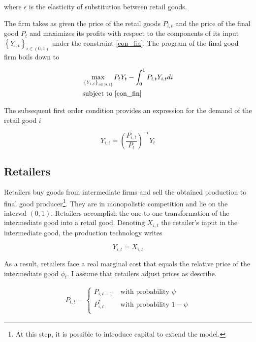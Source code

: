 where $\epsilon$ is the elasticity of substitution between retail goods.

The firm takes as given the price of the retail goods $P_{i,t}$ and the price of the final good $P_t$ and maximizes its profits with respect to the components of its input $\left\{Y_{i,t}\right\}_{i\in(0,1)}$ under the constraint \eqref{con_fin}. The program of the final good firm boils down to

\begin{align*}
&\max_{\left\{Y_{i,t}\right\}_{i\in[0,1]}} P_t Y_t - \int_{0}^{1} P_{i,t} Y_{i,t} di\\
&\text{subject to \eqref{con_fin}}
\end{align*}

The subsequent first order condition provides an expression for the demand of the retail good $i$

\begin{equation}
Y_{i,t} = \left( \frac{P_{i,t}}{P_t} \right)^{-\epsilon} Y_t \label{eq:ret_dem}
\end{equation}

\subsection{Retailers}

Retailers buy goods from intermediate firms and sell the obtained production to final good producer\footnote{At this step, it is possible to introduce capital to extend the model.}. They are in monopolistic competition and lie on the interval $(0,1)$. Retailers accomplish the one-to-one transformation of the intermediate good into a retail good. Denoting $X_{i,t}$ the retailer's input in the intermediate good, the production technology writes

\begin{equation*}
Y_{i,t} = X_{i,t}
\end{equation*}

As a result, retailers face a real marginal cost that equals the relative price of the intermediate good $\phi_t$. I assume that retailers adjust prices as \citet{calvo1983staggered} describe.

\begin{align*}
P_{i,t} = \left\{ \begin{array}{ll}
P_{i,t-1} & \text{ with probability } \psi\\
P_{i,t}^* & \text{ with probability } 1-\psi\\
\end{array}
\right.
\end{align*}


